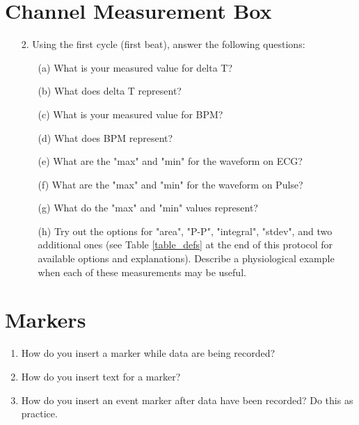 \documentclass{article}
\begin{document}
\section*{Channel Measurement Box}
\begin{itemize}		
	\item[2.] Using the first cycle (first beat), answer the following questions:
		\begin{itemize}
			\item[(a)] What is your measured value for delta T?\vspace{1cm}
			\item[(b)] What does delta T represent?\vspace{1cm}
			\item[(c)] What is your measured value for BPM?\vspace{1cm}
			\item[(d)] What does BPM represent?\vspace{1cm}
			\item[(e)] What are the "max" and "min" for the waveform on ECG?\vspace{1cm}
			\item[(f)] What are the "max" and "min" for the waveform on Pulse?\vspace{1cm}
			\item[(g)] What do the "max" and "min" values represent?\vspace{2cm}
			\item[(h)] Try out the options for "area", "P-P", "integral", "stdev", and two additional ones (see Table \ref{table_defs} at the end of this protocol for available options and explanations). Describe a physiological example when each of these measurements may be useful.\vspace{9cm}
		\end{itemize}
\end{itemize}

\section*{Markers}
\begin{enumerate}
	\item How do you insert a marker while data are being recorded?\vspace{1.5cm}
	\item How do you insert text for a marker?\vspace{1.5cm}
	\item How do you insert an event marker after data have been recorded? Do this as practice.\vspace{2cm}
\end{enumerate}
\end{document}
